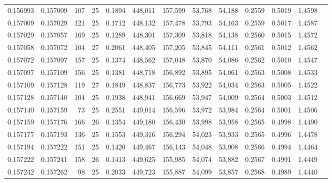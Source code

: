 \begin{tabular}{rrrrrrrrrrrrr}
0.156993 & 0.157009 & 107 &  25 &                                     0.1894 & 448,011 & 157,599 &  53,768 &  54,188 & 0.2559 & 0.5019 & 1.4598 \\
0.157009 & 0.157029 & 121 &  25 &                                     0.1712 & 448,132 & 157,478 &  53,793 &  54,163 & 0.2559 & 0.5017 & 1.4587 \\
0.157029 & 0.157057 & 169 &  25 &                                     0.1289 & 448,301 & 157,309 &  53,818 &  54,138 & 0.2560 & 0.5015 & 1.4572 \\
0.157058 & 0.157072 & 104 &  27 &                                     0.2061 & 448,405 & 157,205 &  53,845 &  54,111 & 0.2561 & 0.5012 & 1.4562 \\
0.157072 & 0.157097 & 157 &  25 &                                     0.1374 & 448,562 & 157,048 &  53,870 &  54,086 & 0.2562 & 0.5010 & 1.4547 \\
0.157097 & 0.157109 & 156 &  25 &                                     0.1381 & 448,718 & 156,892 &  53,895 &  54,061 & 0.2563 & 0.5008 & 1.4533 \\
0.157109 & 0.157128 & 119 &  27 &                                     0.1849 & 448,837 & 156,773 &  53,922 &  54,034 & 0.2563 & 0.5005 & 1.4522 \\
0.157128 & 0.157140 & 104 &  25 &                                     0.1938 & 448,941 & 156,669 &  53,947 &  54,009 & 0.2564 & 0.5003 & 1.4512 \\
0.157140 & 0.157159 &  73 &  25 &                                     0.2551 & 449,014 & 156,596 &  53,972 &  53,984 & 0.2564 & 0.5001 & 1.4506 \\
0.157159 & 0.157176 & 166 &  26 &                                     0.1354 & 449,180 & 156,430 &  53,998 &  53,958 & 0.2565 & 0.4998 & 1.4490 \\
0.157177 & 0.157193 & 136 &  25 &                                     0.1553 & 449,316 & 156,294 &  54,023 &  53,933 & 0.2565 & 0.4996 & 1.4478 \\
0.157194 & 0.157222 & 151 &  25 &                                     0.1420 & 449,467 & 156,143 &  54,048 &  53,908 & 0.2566 & 0.4994 & 1.4464 \\
0.157222 & 0.157241 & 158 &  26 &                                     0.1413 & 449,625 & 155,985 &  54,074 &  53,882 & 0.2567 & 0.4991 & 1.4449 \\
0.157242 & 0.157262 &  98 &  25 &                                     0.2033 & 449,723 & 155,887 &  54,099 &  53,857 & 0.2568 & 0.4989 & 1.4440 \\

\end{tabular}
